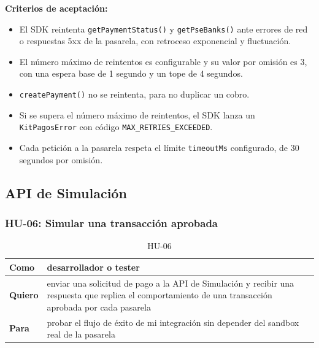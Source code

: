 \textbf{Criterios de aceptación:}
\begin{itemize}
  \item El SDK reintenta \texttt{getPaymentStatus()} y \texttt{getPseBanks()} ante errores de red o respuestas 5xx de la pasarela, con retroceso exponencial y fluctuación.
  \item El número máximo de reintentos es configurable y su valor por omisión es 3, con una espera base de 1 segundo y un tope de 4 segundos.
  \item \texttt{createPayment()} no se reintenta, para no duplicar un cobro.
  \item Si se supera el número máximo de reintentos, el SDK lanza un \texttt{KitPagosError} con código \texttt{MAX\_RETRIES\_EXCEEDED}.
  \item Cada petición a la pasarela respeta el límite \texttt{timeoutMs} configurado, de 30 segundos por omisión.
\end{itemize}

\subsection{API de Simulación}

\subsubsection{HU-06: Simular una transacción aprobada}
\begin{table}[H]
  \centering
  \renewcommand{\arraystretch}{1.2}
  \begin{tabularx}{\textwidth}{|l|X|}
    \hline
    \textbf{Como} & desarrollador o tester \\
    \hline
    \textbf{Quiero} & enviar una solicitud de pago a la API de Simulación y recibir una respuesta que replica el comportamiento de una transacción aprobada por cada pasarela \\
    \hline
    \textbf{Para} & probar el flujo de éxito de mi integración sin depender del sandbox real de la pasarela \\
    \hline
  \end{tabularx}
  \caption{HU-06}
  \label{tab:hu-06}
\end{table}

